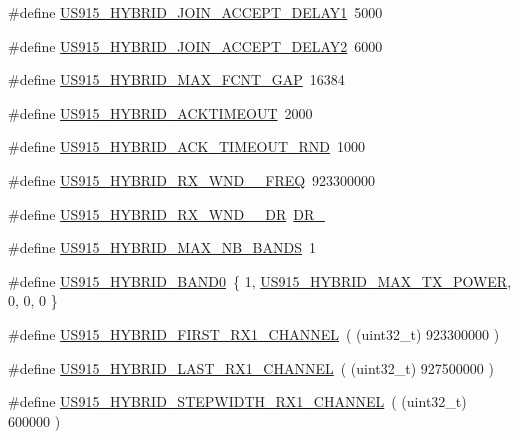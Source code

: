 \begin{DoxyCompactItemize}
\item 
\#define \mbox{\hyperlink{group___r_e_g_i_o_n_u_s915_h_y_b_ga4c1ae5c7dd6fb04bb0275959d38e3bb6}{U\+S915\+\_\+\+H\+Y\+B\+R\+I\+D\+\_\+\+J\+O\+I\+N\+\_\+\+A\+C\+C\+E\+P\+T\+\_\+\+D\+E\+L\+A\+Y1}}~5000
\item 
\#define \mbox{\hyperlink{group___r_e_g_i_o_n_u_s915_h_y_b_ga8860ee877a8a686915e64f7ec6180c4a}{U\+S915\+\_\+\+H\+Y\+B\+R\+I\+D\+\_\+\+J\+O\+I\+N\+\_\+\+A\+C\+C\+E\+P\+T\+\_\+\+D\+E\+L\+A\+Y2}}~6000
\item 
\#define \mbox{\hyperlink{group___r_e_g_i_o_n_u_s915_h_y_b_ga905c03a9bea32e6d9afb2117f209dec5}{U\+S915\+\_\+\+H\+Y\+B\+R\+I\+D\+\_\+\+M\+A\+X\+\_\+\+F\+C\+N\+T\+\_\+\+G\+AP}}~16384
\item 
\#define \mbox{\hyperlink{group___r_e_g_i_o_n_u_s915_h_y_b_ga208cfcf431c114e3095c20552f5c0e77}{U\+S915\+\_\+\+H\+Y\+B\+R\+I\+D\+\_\+\+A\+C\+K\+T\+I\+M\+E\+O\+UT}}~2000
\item 
\#define \mbox{\hyperlink{group___r_e_g_i_o_n_u_s915_h_y_b_ga559607e0b707cb0266b55efa2eb38a79}{U\+S915\+\_\+\+H\+Y\+B\+R\+I\+D\+\_\+\+A\+C\+K\+\_\+\+T\+I\+M\+E\+O\+U\+T\+\_\+\+R\+ND}}~1000
\item 
\#define \mbox{\hyperlink{group___r_e_g_i_o_n_u_s915_h_y_b_gae0b62d21f2751fe9c548352e251b41dc}{U\+S915\+\_\+\+H\+Y\+B\+R\+I\+D\+\_\+\+R\+X\+\_\+\+W\+N\+D\+\_\+\_\+\+F\+R\+EQ}}~923300000
\item 
\#define \mbox{\hyperlink{group___r_e_g_i_o_n_u_s915_h_y_b_ga6149ce49b92f289c275a6c6844c38d46}{U\+S915\+\_\+\+H\+Y\+B\+R\+I\+D\+\_\+\+R\+X\+\_\+\+W\+N\+D\+\_\+\_\+\+DR}}~\mbox{\hyperlink{group___r_e_g_i_o_n_ga44cc96ba80ae464cd9330b784d329c16}{D\+R\+\_}}
\item 
\#define \mbox{\hyperlink{group___r_e_g_i_o_n_u_s915_h_y_b_ga1ddb8622d642ac6254b04f9020ccfcf7}{U\+S915\+\_\+\+H\+Y\+B\+R\+I\+D\+\_\+\+M\+A\+X\+\_\+\+N\+B\+\_\+\+B\+A\+N\+DS}}~1
\item 
\#define \mbox{\hyperlink{group___r_e_g_i_o_n_u_s915_h_y_b_gaf373565fbcca15762d7f9209e78daa6c}{U\+S915\+\_\+\+H\+Y\+B\+R\+I\+D\+\_\+\+B\+A\+N\+D0}}~\{ 1, \mbox{\hyperlink{group___r_e_g_i_o_n_u_s915_h_y_b_ga94a1ed1e5cca1f05f0ac4916e164f529}{U\+S915\+\_\+\+H\+Y\+B\+R\+I\+D\+\_\+\+M\+A\+X\+\_\+\+T\+X\+\_\+\+P\+O\+W\+ER}}, 0, 0, 0 \}
\item 
\#define \mbox{\hyperlink{group___r_e_g_i_o_n_u_s915_h_y_b_ga28e4aa61b58960f8cf317c0d891204f8}{U\+S915\+\_\+\+H\+Y\+B\+R\+I\+D\+\_\+\+F\+I\+R\+S\+T\+\_\+\+R\+X1\+\_\+\+C\+H\+A\+N\+N\+EL}}~( (uint32\+\_\+t) 923300000 )
\item 
\#define \mbox{\hyperlink{group___r_e_g_i_o_n_u_s915_h_y_b_ga27ad9f504f6efe05c69bc1c41cf4ae28}{U\+S915\+\_\+\+H\+Y\+B\+R\+I\+D\+\_\+\+L\+A\+S\+T\+\_\+\+R\+X1\+\_\+\+C\+H\+A\+N\+N\+EL}}~( (uint32\+\_\+t) 927500000 )
\item 
\#define \mbox{\hyperlink{group___r_e_g_i_o_n_u_s915_h_y_b_ga1b77da2ffd6ac645137695b2bccdff08}{U\+S915\+\_\+\+H\+Y\+B\+R\+I\+D\+\_\+\+S\+T\+E\+P\+W\+I\+D\+T\+H\+\_\+\+R\+X1\+\_\+\+C\+H\+A\+N\+N\+EL}}~( (uint32\+\_\+t) 600000 )
\end{DoxyCompactItemize}
